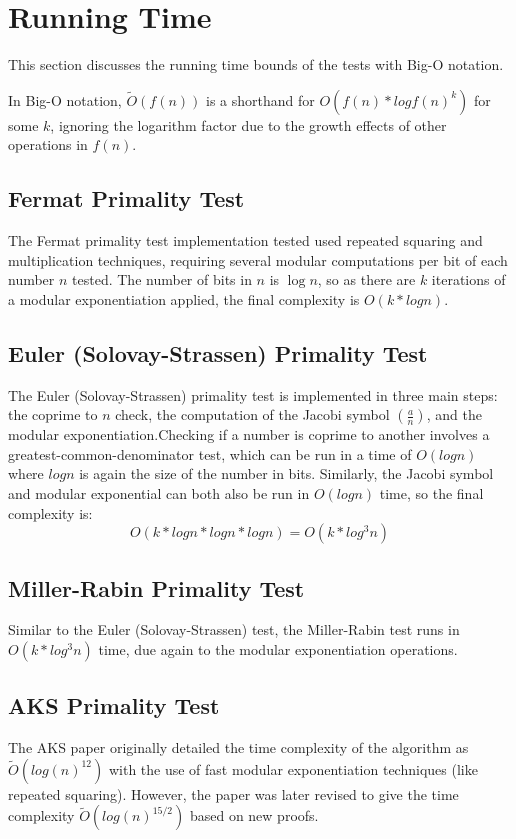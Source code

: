 \documentclass{article}
\begin{document}
\section{Running Time}
This section discusses the running time bounds of the tests with Big-O notation.

In Big-O notation, $\widetilde{O}(f(n))$ is a shorthand for $O(f(n) * log{f(n)}^k)$ for some $k$, ignoring the logarithm factor due to the growth effects of other operations in $f(n)$.

\subsection{Fermat Primality Test}
The Fermat primality test implementation tested used repeated squaring and multiplication techniques, requiring several modular computations per bit of each number $n$ tested. The number of bits in $n$ is $\log{n}$, so as there are $k$ iterations of a modular exponentiation applied, the final complexity is $O(k * log{n})$.

\subsection{Euler (Solovay-Strassen) Primality Test}
The Euler (Solovay-Strassen) primality test is implemented in three main steps: the coprime to $n$ check, the computation of the Jacobi symbol $(\frac{a}{n})$, and the modular exponentiation.Checking if a number is coprime to another involves a greatest-common-denominator test, which can be run in a time of $O(log{n})$ where $log{n}$ is again the size of the number in bits. Similarly, the Jacobi symbol and modular exponential can both also be run in $O(log{n})$ time, so the final complexity is:
\[
    O(k * log{n} * log{n} * log{n}) = O(k * log^3{n})
\]

\subsection{Miller-Rabin Primality Test}
Similar to the Euler (Solovay-Strassen) test, the Miller-Rabin test runs in $O(k * log^3{n})$ time, due again to the modular exponentiation operations.

\subsection{AKS Primality Test}
The AKS paper originally detailed the time complexity of the algorithm as $\widetilde{O}(log(n)^{12})$ with the use of fast modular exponentiation techniques (like repeated squaring). However, the paper was later revised to give the time complexity $\widetilde{O}(log(n)^{15/2})$ based on new proofs.
\end{document}
